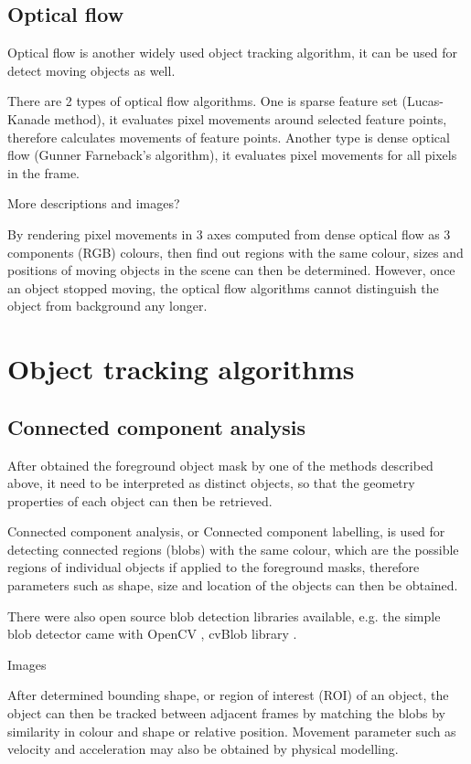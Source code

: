 \subsection{Optical flow}

Optical flow is another widely used object tracking algorithm, it can be used for detect moving objects as well.

There are 2 types of optical flow algorithms. One is sparse feature set (Lucas-Kanade method), it evaluates pixel movements around selected feature points, therefore calculates movements of feature points. Another type is dense optical flow (Gunner Farneback's algorithm), it evaluates pixel movements for all pixels in the frame.

{\color{red}More descriptions and images?}

By rendering pixel movements in 3 axes computed from dense optical flow as 3 components (RGB) colours, then find out regions with the same colour, sizes and positions of moving objects in the scene can then be determined. However, once an object stopped moving, the optical flow algorithms cannot distinguish the object from background any longer.

\section{Object tracking algorithms}
\label{bg:tracking}

\subsection{Connected component analysis}
\label{blob}

After obtained the foreground object mask by one of the methods described above, it need to be interpreted as distinct objects, so that the geometry properties of each object can then be retrieved.

Connected component analysis, or Connected component labelling, is used for detecting connected regions (blobs) with the same colour, which are the possible regions of individual objects if applied to the foreground masks, therefore parameters such as shape, size and location of the objects can then be obtained.

There were also open source blob detection libraries available, e.g. the simple blob detector came with OpenCV \cite{opencv:blob}, cvBlob library \cite{cvblob}.

{\color{red}Images}

After determined bounding shape, or region of interest (ROI) of an object, the object can then be tracked between adjacent frames by matching the blobs by similarity in colour and shape or relative position. Movement parameter such as velocity and acceleration may also be obtained by physical modelling.

